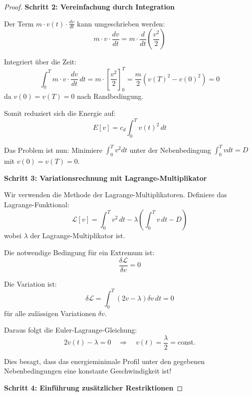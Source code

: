 ﻿\documentclass[a4paper,12pt]{article}
\theoremstyle{definition}
\begin{document}
\begin{proof}
\textbf{Schritt 2: Vereinfachung durch Integration}

Der Term $m \cdot v(t) \cdot \frac{dv}{dt}$ kann umgeschrieben werden:
\begin{equation}
m \cdot v \cdot \frac{dv}{dt} = m \cdot \frac{d}{dt}\left(\frac{v^2}{2}\right)
\end{equation}

Integriert über die Zeit:
\begin{equation}
\int_0^T m \cdot v \cdot \frac{dv}{dt} \, dt = m \cdot \left[\frac{v^2}{2}\right]_0^T = \frac{m}{2}(v(T)^2 - v(0)^2) = 0
\end{equation}
da $v(0) = v(T) = 0$ nach Randbedingung.

Somit reduziert sich die Energie auf:
\begin{equation}
E[v] = c_d \int_0^T v(t)^2 \, dt
\end{equation}

Das Problem ist nun: Minimiere $\int_0^T v^2 dt$ unter der Nebenbedingung $\int_0^T v dt = D$ mit $v(0) = v(T) = 0$.

\textbf{Schritt 3: Variationsrechnung mit Lagrange-Multiplikator}

Wir verwenden die Methode der Lagrange-Multiplikatoren. Definiere das Lagrange-Funktional:
\begin{equation}
\mathcal{L}[v] = \int_0^T v^2 \, dt - \lambda \left(\int_0^T v \, dt - D\right)
\end{equation}
wobei $\lambda$ der Lagrange-Multiplikator ist.

Die notwendige Bedingung für ein Extremum ist:
\begin{equation}
\frac{\delta \mathcal{L}}{\delta v} = 0
\end{equation}

Die Variation ist:
\begin{equation}
\delta \mathcal{L} = \int_0^T (2v - \lambda) \delta v \, dt = 0
\end{equation}
für alle zulässigen Variationen $\delta v$.

Daraus folgt die Euler-Lagrange-Gleichung:
\begin{equation}
2v(t) - \lambda = 0 \quad \Rightarrow \quad v(t) = \frac{\lambda}{2} = \text{const.}
\end{equation}

Dies besagt, dass das energieminimale Profil unter den gegebenen Nebenbedingungen eine konstante Geschwindigkeit ist!

\textbf{Schritt 4: Einführung zusätzlicher Restriktionen}


\end{proof}
\end{document}
